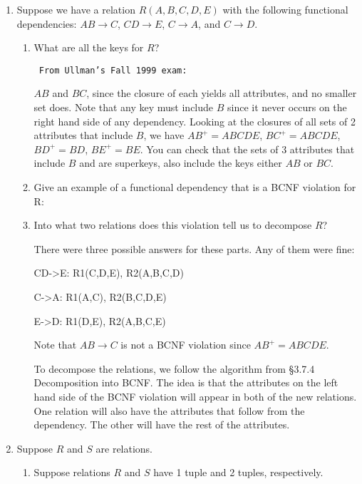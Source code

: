 {\begin{enumerate}
{The common mistakes were leaving off the class definition (c-style
program) or forgetting the main method.

}

\item Suppose we have a relation $R(A,B,C,D,E)$ with the following
functional dependencies: $AB\rightarrow C$, $CD\rightarrow E$,
$C \rightarrow A$, and $C \rightarrow D$.
\begin{enumerate}
  \item What are all the keys for $R$?

{\tt
From Ullman's Fall 1999 exam:

	$AB$ and $BC$, since the closure of each yields all attributes, 
	and no smaller set does.  Note that any key must include $B$
	since it never occurs on the right hand side of any dependency.
	Looking at the closures of all sets of 2 attributes that include
	$B$, we have $AB^+ = ABCDE$, $BC^+ = ABCDE$, $BD^+ = BD$, 
	$BE^+ = BE$.  You can check that the sets of 3 attributes that
	include $B$ and are superkeys, also include the keys either 
	$AB$ or $BC$.
}

  \item Give an example of a functional dependency that is a 
	BCNF violation for R:
  \item Into what two relations does this violation tell us to
	decompose $R$?

{\tt

There were three possible answers for these parts. Any of them were fine: 

     CD->E: R1(C,D,E), R2(A,B,C,D)

     C->A: R1(A,C), R2(B,C,D,E)

     E->D: R1(D,E), R2(A,B,C,E) 


Note that $AB\rightarrow C$ is not a BCNF violation since 
$AB^+ = ABCDE$.

To decompose the relations, we follow the algorithm from 
\S 3.7.4 Decomposition into BCNF.  The idea is that the attributes 
on the left hand side of the BCNF violation will appear in both
of the new relations.  One relation will also have the attributes
that follow from the dependency.  The other will have the rest of the
attributes.
}

\end{enumerate}

\item Suppose $R$ and $S$ are relations.
  \begin{enumerate}
    \item Suppose relations $R$ and $S$ have 1 tuple and 2 tuples,
	respectively.  


\end{enumerate}
\end{enumerate}}
